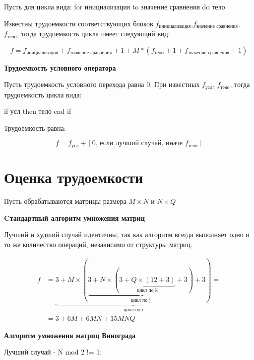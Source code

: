 Пусть для цикла вида:
for инициализация to значение сравнения do тело
    
Известны трудоемкости соответствующих блоков $f_{\text{инициализация}}$,\newline$f_{\text{значение сравнения}}$, $f_{\text{тело}}$, тогда трудоемкость цикла имеет следующий вид:

\begin{equation}
    \label{eq:work1}
    f = f_{\text{инициализация}} + f_{\text{значение сравнения}} + 1 + M*(f_{\text{тело}} + 1 + f_{\text{значение сравнения}} + 1)
\end{equation}

\textbf{Трудоемкость условного оператора}

Пусть трудоемкость условного перехода равна 0. При известных $f_\text{усл}$, $f_{\text{тело}}$, тогда трудоемкость цикла вида:

if усл then тело end if

Трудоемкость равна:

\begin{equation}
    \label{eq:work2}
    f = f_{\text{усл}} + [0\text{, если лучший случай, иначе } f_{\text{тело}}]
\end{equation}

\section{Оценка трудоемкости}

Пусть обрабатываются матрицы размера $M \times N$ и $N \times Q$

\textbf{Cтандартный алгоритм умножения матриц}

Лучший и худший случай идентичны, так как алгоритм всегда выполняет одно и то же количество операций, независимо от структуры матриц.

\begin{equation}
    \begin{aligned}
    f &= \underbrace{3 + M \times (\underbrace{3 + N \times (\underbrace{3 + Q \times (12 + 3)}_{\text{цикл по k}} + 3)}_{\text{цикл по j}} + 3)}_{\text{цикл по i}} = \\
    &= 3+6M+6MN+15MNQ
    \end{aligned}
\end{equation}

\textbf{Алгоритм умножения матриц Винограда}

Лучший случай - N mod 2 != 1:

